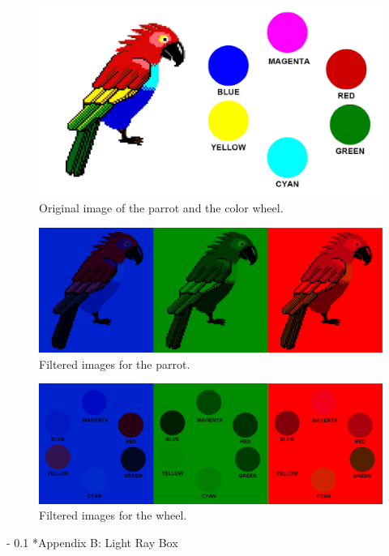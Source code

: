 \documentclass[twoside]{article}
\makeatletter
\renewcommand\section{\@startsection
   {section}{1}{0pt}%
   {-\baselineskip}%
   {0.1\baselineskip}%
   {\normalfont\large\bfseries}}%
\makeatother
\begin{document}
\captionsetup[figure]{width=5in}
\begin{figure}[h!]
\centering
\includegraphics[scale=0.25]{pw}
\caption{Original image of the parrot and the color wheel.}
\label{fig:phasediff}
\end{figure}

\captionsetup[figure]{width=5in}
\begin{figure}[h!]
\centering
\includegraphics[scale=0.21]{parrot}
\caption{Filtered images for the parrot.}
\label{fig:phasediff}
\end{figure}

\captionsetup[figure]{width=5in}
\begin{figure}[h!]
\centering
\includegraphics[scale=0.2]{wheel}
\caption{Filtered images for the wheel.}
\label{fig:phasediff}
\end{figure}

\newpage
\section*{Appendix B: Light Ray Box}
\label{sec:appendixA}
\end{document}
